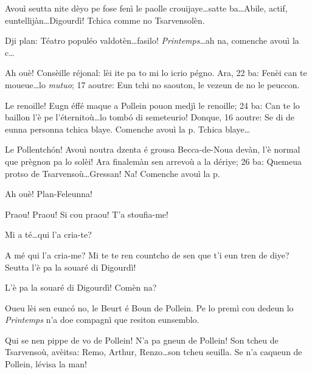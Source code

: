 \begin{drama}

\Laurentspeaks Avouì seutta nite dèyo pe fose fenì le paolle crouijaye\ldots satte ba\ldots \og Abile, actif, euntellijàn\fg\ldots Digourdì! Tchica com\-me no Tsarvensolèn.


\Laurentspeaks Dji plan: \og Téatro populéo valdotèn\fg\ldots fasilo! \textit{Printemps}\ldots ah na, comenche avouì la c\ldots


\Laurentspeaks Ah ouè! \og Consèille réjonal\fg: lèi ite pa to mi lo icrio pégno. Ara, 22 ba: \og Fenèi can te moueue\ldots lo \textit{mutuo}; 17 aoutre: \og Eun tchi no saouton, le vezeun de no le peuccon\fg.


\Laurentspeaks Le renoille! Eugn éffé maque a Pollein pouon medjì le renoille; 24 ba: \og Can te lo baillon l'è pe l'éternitoù\fg\ldots lo tomb\'o di semeteurio! Donque, 16 aoutre: \og Se di de eunna personna tchica blaye\fg. Comenche avouì la p. Tchica blaye\ldots


\Laurentspeaks Le Pollentch\'on! Avouì noutra dzenta é grousa Becca-de-Noua devàn, l'è normal que prègnon pa lo solèi! Ara finalemàn sen arrevoù a la dériye; 26 ba: \og Quemeua protso de Tsarvensoù\fg\ldots Gressan! Na! Comenche avouì la p.


\Laurentspeaks Ah ouè! Plan-Feleunna!


\Taniaspeaks{} Praou! Praou! Si cou praou! T'a stoufia-me!

\Laurentspeaks{} Mi a té\ldots qui l'a cria-te?

\Taniaspeaks A mé qui l'a cria-me? Mi te te ren countcho de sen que t'i eun tren de diye? Seutta l'è pa la souaré di Digourdì!

\Laurentspeaks{} L'è pa la souaré di Digourdì! Comèn na?

\Taniaspeaks Oueu lèi sen eunc\'o no, le Beurt é Boun de Pollein. Pe lo premì cou dedeun lo \textit{Printemps} n'a doe compagnì que resiton eunsemblo.

\Laurentspeaks Qui se nen pippe de vo de Pollein!  N'a pa gneun de Pollein! Son tcheu de Tsarvensoù, avèitsa: Remo, Arthur, Renzo\ldots son tcheu seuilla. Se n'a caqueun de Pollein, lévisa la man!


\end{drama}
